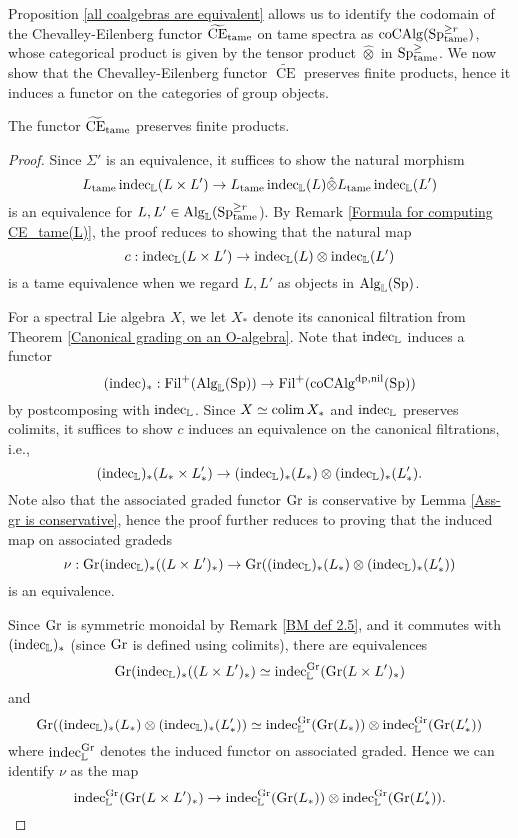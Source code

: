 Proposition \ref{all coalgebras are equivalent} allows us to identify the codomain of the Chevalley-Eilenberg functor $\tildeCE_{\tame}$ on tame spectra as $\coCAlg(\Sp^{\geq r}_{\tame})$, whose categorical product is given by the tensor product $\hat{\otimes}$ in $\Sp^{\geq}_{\tame}$.
We now show that the Chevalley-Eilenberg functor $\widetilde{\operatorname{CE}}$ preserves finite products, hence it induces a functor on the categories of group objects.
\begin{lemma}
\label{CE preserves products}
	The functor 
	$\widetilde{\operatorname{CE}}_{\tame}$
	preserves finite products.
\end{lemma}
\begin{proof}
    Since $\Sigma'$ is an equivalence, it suffices to show
	the natural morphism 
	\[
	L_{\tame}\indec_{\BL}(L \times L') 
	\to 
	L_{\tame}\indec_{\BL}(L)\hat{\otimes} 
	L_{\tame}\indec_{\BL}(L') 
	\]
	is an equivalence for $L,L' \in \Alg_{\BL}(\Sp^{\geq r}_{\tame}$). 
	By Remark \ref{Formula for computing CE_tame(L)}, the proof reduces to showing that the natural map 
	\[
    c:	\indec_{\BL}(L \times L') 
	\to 
	\indec_{\BL}(L)\otimes \indec_{\BL}(L') 
	\]
	is a tame equivalence when we regard $L,L'$ as objects in $\Alg_{\BL}(\Sp)$.

	For a spectral Lie algebra $X$, we let $X_*$ denote its canonical filtration from Theorem \ref{Canonical grading on an O-algebra}. 
	Note that $\indec_{\BL}$ induces a functor 
	$$
	(\indec)_*: \Fil^{+}(\Alg_{\BL}(\Sp))
	\to 
	\Fil^{+}(\coCAlg^{\divpow,\nil}(\Sp))
	$$
	by postcomposing with $\indec_{\BL}$.
	Since $X\simeq \colim X_*$ and $\indec_{\BL}$ preserves colimits, it suffices to show $c$ induces an equivalence on the canonical filtrations, i.e.,
	$$
	(\indec_{\BL})_*(L_* \times L'_*)
	\to 
	(\indec_{\BL})_*(L_*) \otimes (\indec_{\BL})_*(L'_*).
	$$
	Note also that the associated graded functor $\Graded$ is conservative by Lemma \ref{Ass-gr is conservative}, hence the proof further reduces to proving that the induced map on associated gradeds
    \[
    \nu:
	\Graded (\indec_{\BL})_*( (L \times L')_{*} )
	\to 
	\Graded ((\indec_{\BL})_*(L_*)\otimes (\indec_{\BL})_*(L'_*))
	\]
	is an equivalence.
	
	Since $\Graded$ is symmetric monoidal by Remark \ref{BM def 2.5}, and it commutes with $(\indec_{\BL})_*$ (since $\Graded$ is defined using colimits), there are equivalences
	$$
	\Graded (\indec_{\BL})_*( (L \times L')_{*} )
	\simeq \indec_{\BL}^{\Graded} (\Graded (L\times L')_{*})
	$$
	and 
	$$
	\Graded ((\indec_{\BL})_*(L_*)\otimes (\indec_{\BL})_*(L'_*)) 
	\simeq 
	\indec^{\Graded}_{\BL}(\Graded(L_*)) \otimes 
	\indec^{\Graded}_{\BL}(\Graded(L'_*))
	$$
	where $\indec^{\Graded}_{\BL}$ denotes the induced functor on associated graded. Hence we can identify $\nu$ as the map
	$$
	\indec_{\BL}^{\Graded} (\Graded (L\times L')_{*}) 
	\to 
	\indec^{\Graded}_{\BL}(\Graded(L_*)) \otimes 
	\indec^{\Graded}_{\BL}(\Graded(L'_*)).
	$$
	

\end{proof}
